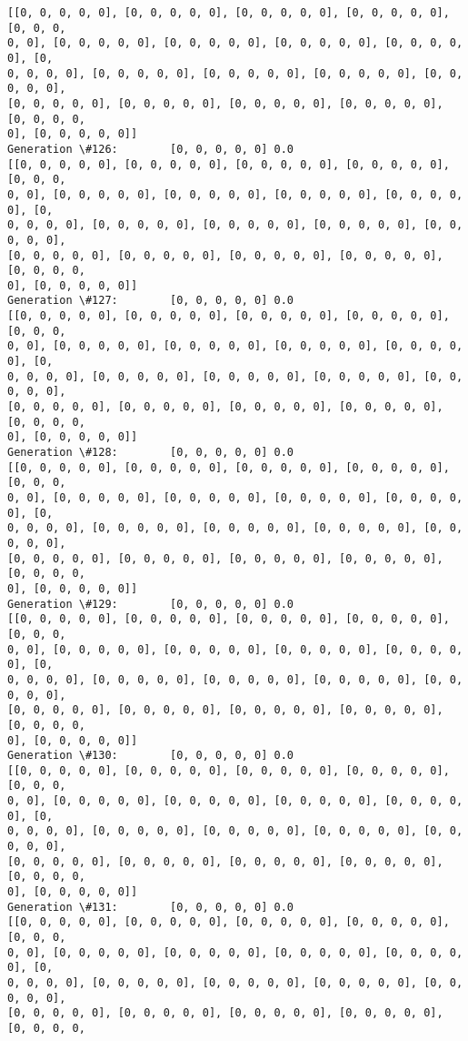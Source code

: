 \documentclass[11pt]{article}
\begin{document}
\begin{Verbatim}[commandchars=\\\{\}]
[[0, 0, 0, 0, 0], [0, 0, 0, 0, 0], [0, 0, 0, 0, 0], [0, 0, 0, 0, 0], [0, 0, 0,
0, 0], [0, 0, 0, 0, 0], [0, 0, 0, 0, 0], [0, 0, 0, 0, 0], [0, 0, 0, 0, 0], [0,
0, 0, 0, 0], [0, 0, 0, 0, 0], [0, 0, 0, 0, 0], [0, 0, 0, 0, 0], [0, 0, 0, 0, 0],
[0, 0, 0, 0, 0], [0, 0, 0, 0, 0], [0, 0, 0, 0, 0], [0, 0, 0, 0, 0], [0, 0, 0, 0,
0], [0, 0, 0, 0, 0]]
Generation \#126:        [0, 0, 0, 0, 0] 0.0
[[0, 0, 0, 0, 0], [0, 0, 0, 0, 0], [0, 0, 0, 0, 0], [0, 0, 0, 0, 0], [0, 0, 0,
0, 0], [0, 0, 0, 0, 0], [0, 0, 0, 0, 0], [0, 0, 0, 0, 0], [0, 0, 0, 0, 0], [0,
0, 0, 0, 0], [0, 0, 0, 0, 0], [0, 0, 0, 0, 0], [0, 0, 0, 0, 0], [0, 0, 0, 0, 0],
[0, 0, 0, 0, 0], [0, 0, 0, 0, 0], [0, 0, 0, 0, 0], [0, 0, 0, 0, 0], [0, 0, 0, 0,
0], [0, 0, 0, 0, 0]]
Generation \#127:        [0, 0, 0, 0, 0] 0.0
[[0, 0, 0, 0, 0], [0, 0, 0, 0, 0], [0, 0, 0, 0, 0], [0, 0, 0, 0, 0], [0, 0, 0,
0, 0], [0, 0, 0, 0, 0], [0, 0, 0, 0, 0], [0, 0, 0, 0, 0], [0, 0, 0, 0, 0], [0,
0, 0, 0, 0], [0, 0, 0, 0, 0], [0, 0, 0, 0, 0], [0, 0, 0, 0, 0], [0, 0, 0, 0, 0],
[0, 0, 0, 0, 0], [0, 0, 0, 0, 0], [0, 0, 0, 0, 0], [0, 0, 0, 0, 0], [0, 0, 0, 0,
0], [0, 0, 0, 0, 0]]
Generation \#128:        [0, 0, 0, 0, 0] 0.0
[[0, 0, 0, 0, 0], [0, 0, 0, 0, 0], [0, 0, 0, 0, 0], [0, 0, 0, 0, 0], [0, 0, 0,
0, 0], [0, 0, 0, 0, 0], [0, 0, 0, 0, 0], [0, 0, 0, 0, 0], [0, 0, 0, 0, 0], [0,
0, 0, 0, 0], [0, 0, 0, 0, 0], [0, 0, 0, 0, 0], [0, 0, 0, 0, 0], [0, 0, 0, 0, 0],
[0, 0, 0, 0, 0], [0, 0, 0, 0, 0], [0, 0, 0, 0, 0], [0, 0, 0, 0, 0], [0, 0, 0, 0,
0], [0, 0, 0, 0, 0]]
Generation \#129:        [0, 0, 0, 0, 0] 0.0
[[0, 0, 0, 0, 0], [0, 0, 0, 0, 0], [0, 0, 0, 0, 0], [0, 0, 0, 0, 0], [0, 0, 0,
0, 0], [0, 0, 0, 0, 0], [0, 0, 0, 0, 0], [0, 0, 0, 0, 0], [0, 0, 0, 0, 0], [0,
0, 0, 0, 0], [0, 0, 0, 0, 0], [0, 0, 0, 0, 0], [0, 0, 0, 0, 0], [0, 0, 0, 0, 0],
[0, 0, 0, 0, 0], [0, 0, 0, 0, 0], [0, 0, 0, 0, 0], [0, 0, 0, 0, 0], [0, 0, 0, 0,
0], [0, 0, 0, 0, 0]]
Generation \#130:        [0, 0, 0, 0, 0] 0.0
[[0, 0, 0, 0, 0], [0, 0, 0, 0, 0], [0, 0, 0, 0, 0], [0, 0, 0, 0, 0], [0, 0, 0,
0, 0], [0, 0, 0, 0, 0], [0, 0, 0, 0, 0], [0, 0, 0, 0, 0], [0, 0, 0, 0, 0], [0,
0, 0, 0, 0], [0, 0, 0, 0, 0], [0, 0, 0, 0, 0], [0, 0, 0, 0, 0], [0, 0, 0, 0, 0],
[0, 0, 0, 0, 0], [0, 0, 0, 0, 0], [0, 0, 0, 0, 0], [0, 0, 0, 0, 0], [0, 0, 0, 0,
0], [0, 0, 0, 0, 0]]
Generation \#131:        [0, 0, 0, 0, 0] 0.0
[[0, 0, 0, 0, 0], [0, 0, 0, 0, 0], [0, 0, 0, 0, 0], [0, 0, 0, 0, 0], [0, 0, 0,
0, 0], [0, 0, 0, 0, 0], [0, 0, 0, 0, 0], [0, 0, 0, 0, 0], [0, 0, 0, 0, 0], [0,
0, 0, 0, 0], [0, 0, 0, 0, 0], [0, 0, 0, 0, 0], [0, 0, 0, 0, 0], [0, 0, 0, 0, 0],
[0, 0, 0, 0, 0], [0, 0, 0, 0, 0], [0, 0, 0, 0, 0], [0, 0, 0, 0, 0], [0, 0, 0, 0,

\end{Verbatim}
\end{document}
